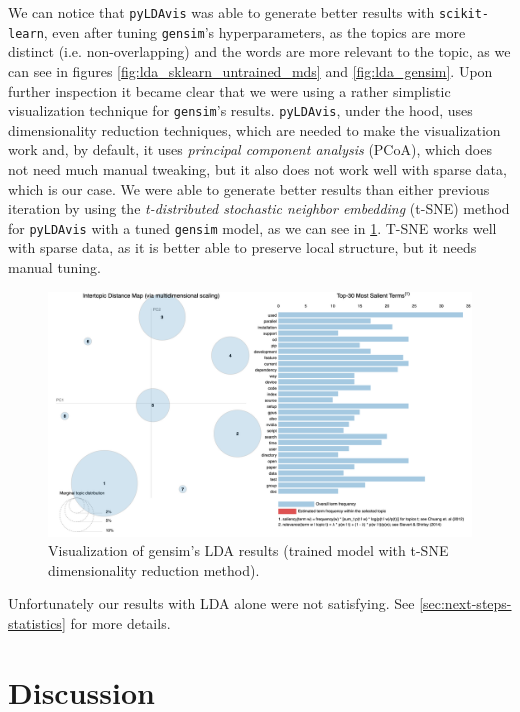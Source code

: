 \documentclass[11pt, conference, onecolumn, final]{IEEEtran}
\begin{document}
We can notice that \verb|pyLDAvis| was able to generate better results with
\verb|scikit-learn|, even after tuning \verb|gensim|'s hyperparameters, as the
topics are more distinct (i.e. non-overlapping) and the words are more relevant
to the topic, as we can see in figures \cref{fig:lda_sklearn_untrained_mds} and
\cref{fig:lda_gensim}.
Upon further inspection it became clear that we were using a rather simplistic
visualization technique for \verb|gensim|'s results.
\verb|pyLDAvis|, under the hood, uses dimensionality reduction techniques,
which are needed to make the visualization work and, by default, it uses
\textit{principal component analysis} (PCoA), which does not need much manual
tweaking, but it also does not work well with sparse data, which is our case.
We were able to generate better results than either previous iteration by using
the \textit{t-distributed stochastic neighbor embedding} (t-SNE) method for
\verb|pyLDAvis| with a tuned \verb|gensim| model, as we can see in
\cref{fig:lda_gensim_tsne}.
T-SNE works well with sparse data, as it is better able to preserve local
structure, but it needs manual tuning.

\begin{figure}[H]
    \centering
    \includegraphics[width=\linewidth]{gensim-tsne.png}
    \caption{Visualization of gensim's LDA results (trained model with t-SNE
        dimensionality reduction method).}
    \label{fig:lda_gensim_tsne}
\end{figure}

Unfortunately our results with LDA alone were not satisfying.
See \cref{sec:next-steps-statistics} for more details.

\section{Discussion} \label{sec:discussion}
\end{document}
